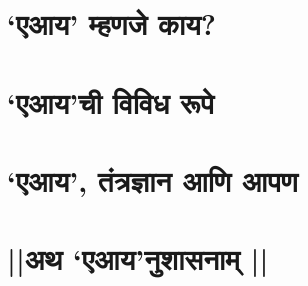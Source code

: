 \chapter*{`एआय' म्हणजे काय? }




\chapter*{`एआय'ची विविध रूपे }
















\chapter*{`एआय', तंत्रज्ञान आणि आपण  }


\chapter*{||अथ `एआय'नुशासनाम् ||}
